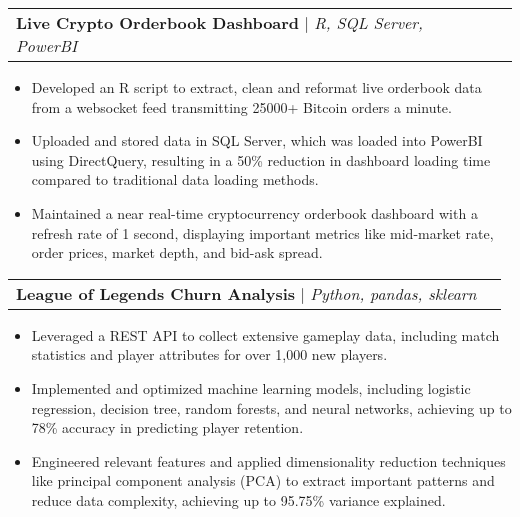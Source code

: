\documentclass[letterpaper,11pt]{article}
\makeatletter
\newcommand{\resumeItem}[1]{
  \item\small{
    {#1 \vspace{-2pt}}
  }
}
\newcommand{\resumeProjectHeading}[2]{
    \item
    \begin{tabular*}{0.97\textwidth}{l@{\extracolsep{\fill}}r}
      \small#1 & #2 \\
    \end{tabular*}\vspace{-7pt}
}
\newcommand{\resumeItemListStart}{\begin{itemize}}
\newcommand{\resumeItemListEnd}{\end{itemize}\vspace{-5pt}}
\makeatother
\begin{document}
    \resumeProjectHeading
        {\textbf{Live Crypto Orderbook Dashboard} $|$ \emph{R, SQL Server, PowerBI}}{}
        \resumeItemListStart
            \resumeItem{Developed an R script to extract, clean and reformat live orderbook data from a websocket 
            feed transmitting 25000+ Bitcoin orders a minute.}
            \resumeItem{Uploaded and stored data in SQL Server, which was loaded into PowerBI 
            using DirectQuery, resulting in a 50\% reduction in dashboard loading time compared to traditional data loading methods.}
            \resumeItem{Maintained a near real-time cryptocurrency orderbook dashboard with a refresh rate of 1 second, 
            displaying important metrics like mid-market rate, order prices, market depth, 
            and bid-ask spread.}
        \resumeItemListEnd

        \resumeProjectHeading
        {\textbf{League of Legends Churn Analysis} $|$ \emph{Python, pandas, sklearn}}{}
        \resumeItemListStart
            \resumeItem{Leveraged a REST API to collect extensive gameplay data, 
            including match statistics and player attributes for over 1,000 new players.}
            \resumeItem{Implemented and optimized machine learning models, including logistic 
            regression, decision tree, random forests, and neural networks, achieving up to 78\% accuracy in predicting player retention.}
            \resumeItem{Engineered relevant features and applied dimensionality reduction techniques like principal component analysis 
            (PCA) to extract important patterns and reduce data complexity, achieving up to 95.75\% variance explained.}
          \resumeItemListEnd

\end{document}
